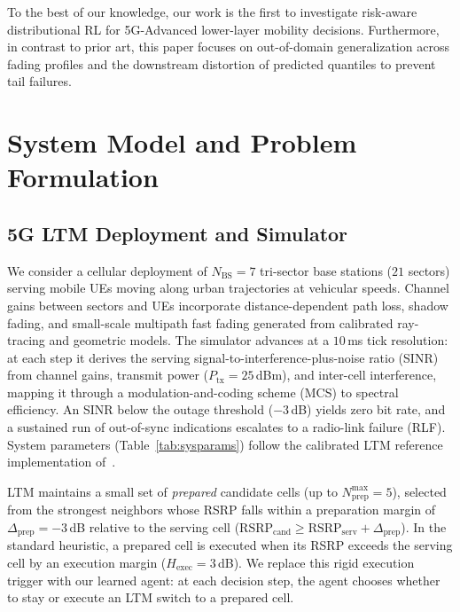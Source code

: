 \documentclass{ieeetmlcn}
\begin{document}
To the best of our knowledge, our work is the first to investigate risk-aware distributional RL for 5G-Advanced lower-layer mobility decisions. Furthermore, in contrast to prior art, this paper focuses on out-of-domain generalization across fading profiles and the downstream distortion of predicted quantiles to prevent tail failures.

\section{System Model and Problem Formulation}
\label{sec:model}

\subsection{5G LTM Deployment and Simulator}
We consider a cellular deployment of $N_{\text{BS}} = 7$ tri-sector base stations ($21$ sectors) serving mobile UEs moving along urban trajectories at vehicular speeds. Channel gains between sectors and UEs incorporate distance-dependent path loss, shadow fading, and small-scale multipath fast fading generated from calibrated ray-tracing and geometric models. The simulator advances at a $10$\,ms tick resolution: at each step it derives the serving signal-to-interference-plus-noise ratio (SINR) from channel gains, transmit power ($P_{\text{tx}} = 25$\,dBm), and inter-cell interference, mapping it through a modulation-and-coding scheme (MCS) to spectral efficiency. An SINR below the outage threshold ($-3$\,dB) yields zero bit rate, and a sustained run of out-of-sync indications escalates to a radio-link failure (RLF). System parameters (Table~\ref{tab:sysparams}) follow the calibrated LTM reference implementation of~\cite{cmab_ho}.

LTM maintains a small set of \emph{prepared} candidate cells (up to $N_{\text{prep}}^{\max} = 5$), selected from the strongest neighbors whose RSRP falls within a preparation margin of $\Delta_{\text{prep}} = -3$\,dB relative to the serving cell ($\text{RSRP}_{\text{cand}} \ge \text{RSRP}_{\text{serv}} + \Delta_{\text{prep}}$). In the standard heuristic, a prepared cell is executed when its RSRP exceeds the serving cell by an execution margin ($H_{\text{exec}} = 3$\,dB). We replace this rigid execution trigger with our learned agent: at each decision step, the agent chooses whether to stay or execute an LTM switch to a prepared cell.
\end{document}
